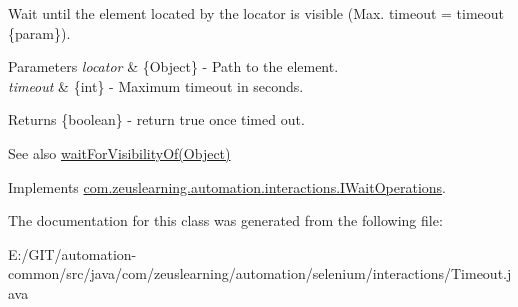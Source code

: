 Wait until the element located by the locator is visible (Max. timeout = timeout \{param\}).


\begin{DoxyParams}{Parameters}
{\em locator} & \{Object\} -\/ Path to the element. \\
\hline
{\em timeout} & \{int\} -\/ Maximum timeout in seconds.\\
\hline
\end{DoxyParams}
\begin{DoxyReturn}{Returns}
\{boolean\} -\/ return {\ttfamily true} once timed out.
\end{DoxyReturn}
\begin{DoxySeeAlso}{See also}
\hyperlink{classcom_1_1zeuslearning_1_1automation_1_1selenium_1_1interactions_1_1Timeout_a327e77cb8ede06a2f7eef9d765812b7a}{wait\+For\+Visibility\+Of(\+Object)} 
\end{DoxySeeAlso}


Implements \hyperlink{interfacecom_1_1zeuslearning_1_1automation_1_1interactions_1_1IWaitOperations_a608da544ffa2ea81c99c5cb17e8e60ba}{com.\+zeuslearning.\+automation.\+interactions.\+I\+Wait\+Operations}.



The documentation for this class was generated from the following file\+:\begin{DoxyCompactItemize}
\item 
E\+:/\+G\+I\+T/automation-\/common/src/java/com/zeuslearning/automation/selenium/interactions/Timeout.\+java\end{DoxyCompactItemize}
